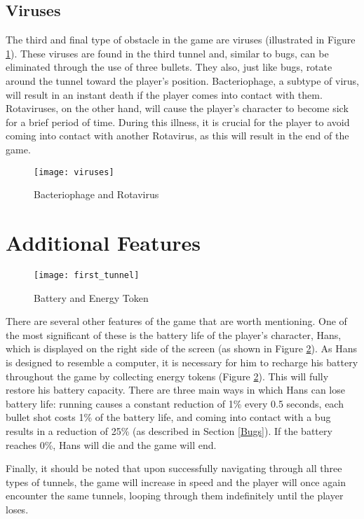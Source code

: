 \subsection{Viruses}
The third and final type of obstacle in the game are viruses (illustrated in Figure \ref{fig:viruses}). These viruses are found in the third tunnel and, similar to bugs, can be eliminated through the use of three bullets. They also, just like bugs, rotate around the tunnel toward the player's position. Bacteriophage, a subtype of virus, will result in an instant death if the player comes into contact with them. Rotaviruses, on the other hand, will cause the player's character to become sick for a brief period of time. During this illness, it is crucial for the player to avoid coming into contact with another Rotavirus, as this will result in the end of the game.

\begin{figure}[h]
    \centering
    \texttt{[image: viruses]}
    \caption{Bacteriophage and Rotavirus}
    \label{fig:viruses}
\end{figure}

\section{Additional Features}
\label{AdditionalFeatures}
\begin{figure}[h]
    \centering
    \texttt{[image: first\_tunnel]}
    \caption{Battery and Energy Token}
    \label{fig:batteryToken}
\end{figure}

There are several other features of the game that are worth mentioning. One of the most significant of these is the battery life of the player's character, Hans, which is displayed on the right side of the screen (as shown in Figure \ref{fig:batteryToken}). As Hans is designed to resemble a computer, it is necessary for him to recharge his battery throughout the game by collecting energy tokens (Figure \ref{fig:batteryToken}). This will fully restore his battery capacity. There are three main ways in which Hans can lose battery life: running causes a constant reduction of 1\% every 0.5 seconds, each bullet shot costs 1\% of the battery life, and coming into contact with a bug results in a reduction of 25\% (as described in Section \ref{Bugs}). If the battery reaches 0\%, Hans will die and the game will end.

Finally, it should be noted that upon successfully navigating through all three types of tunnels, the game will increase in speed and the player will once again encounter the same tunnels, looping through them indefinitely until the player loses.

